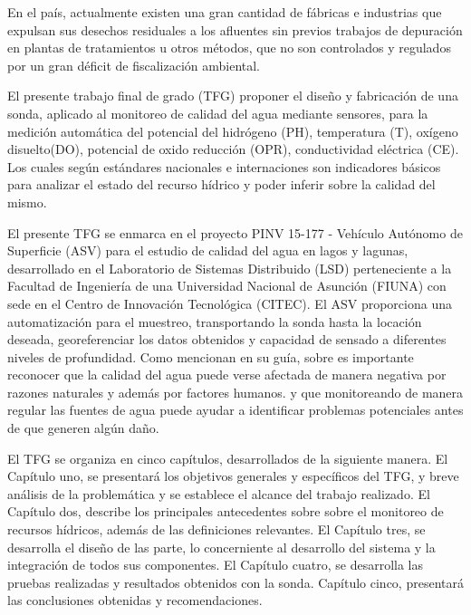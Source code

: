 En el país, actualmente existen una gran cantidad de fábricas e industrias que expulsan sus desechos residuales a los afluentes sin previos trabajos de depuración en plantas de tratamientos u otros métodos, que no son controlados y regulados por un gran déficit de fiscalización ambiental. 


%
%
%

El presente trabajo final de grado (TFG) proponer el diseño y fabricación de una sonda, aplicado al monitoreo de calidad del agua mediante sensores, para la medición automática del potencial del hidrógeno (PH), temperatura (T), oxígeno disuelto(DO), potencial de oxido reducción (OPR), conductividad eléctrica (CE). 
Los cuales según estándares nacionales e internaciones son indicadores básicos para analizar el estado del recurso hídrico y poder inferir sobre la calidad del mismo.  


El presente TFG se enmarca en el proyecto PINV 15-177 - Vehículo Autónomo de Superficie (ASV) para el estudio de calidad del agua en lagos y lagunas, desarrollado en el Laboratorio de Sistemas Distribuido (LSD) perteneciente a la Facultad de Ingeniería de una Universidad Nacional de Asunción (FIUNA) con sede en el Centro de Innovación Tecnológica (CITEC). 
El ASV proporciona una automatización para el muestreo, transportando la sonda hasta la locación deseada, georeferenciar los datos obtenidos y capacidad de sensado a diferentes niveles de profundidad. 
Como mencionan \cite{guiaHANNA}en su gu\'ia, sobre es importante reconocer que la calidad del agua puede verse afectada de manera negativa por razones naturales y  además por factores humanos. y que monitoreando de manera regular las fuentes de agua puede ayudar a identificar problemas potenciales antes de que generen algún daño.


El TFG  se organiza en cinco capítulos, desarrollados de la siguiente manera. 
El Capítulo uno, se presentará los objetivos generales y específicos del TFG,  y breve an\'alisis de la problemática y se establece el alcance del trabajo realizado.
El Capítulo dos, describe los principales antecedentes sobre sobre el monitoreo de recursos hídricos, además de las definiciones relevantes.
El Capítulo tres, se desarrolla el diseño de las parte, lo concerniente al desarrollo del sistema y la integración de todos sus componentes.   
El Capítulo cuatro, se desarrolla las pruebas realizadas y resultados obtenidos con la sonda. 
Capítulo cinco,  presentará las conclusiones obtenidas y recomendaciones.

